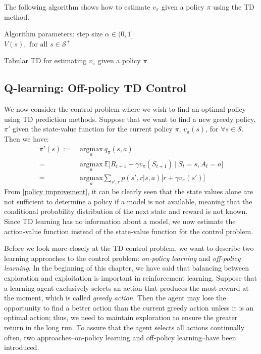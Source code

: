 The following algorithm shows how to estimate $v_\pi$ given a policy $\pi$ using the TD method.

\begin{algorithm}[H]
\SetAlgoLined
 Algorithm parameters: step size $\alpha \in (0,1]$ \\
  $V(s), \text{ for all } s\in \mathcal{S}^+$ \\
 \caption{Tabular TD for estimating $v_\pi$ given a policy $\pi$}
\end{algorithm}

\subsection{Q-learning: Off-policy TD Control}
\label{subsec: Q-learning}
We now consider the control problem where we wish to find an optimal policy using TD prediction methods. Suppose that we want to find a new greedy policy, $\pi'$ given the state-value function for the current policy $\pi$, $v_\pi(s)$, for $\forall s\in \mathcal{S}$. Then we have:
\begin{align}
    \pi'(s) :=& \ \underset{a}{\text{argmax}} \ q_\pi(s,a)\nonumber\\
    =& \ \underset{a}{\text{argmax}}  \ \mathbb{E}\big[R_{t+1} + \gamma v_\pi(S_{t+1}) \ | \ S_t = s, A_t = a\big]\nonumber\\
    =& \ \underset{a}{\text{argmax}} \sum_{s', r} p(s', r | s, a)\big[r + \gamma v_\pi(s')\big] \label{policy improvement}
\end{align}
From \eqref{policy improvement}, it can be clearly seen that the state values alone are not sufficient to determine a policy if a model is not available, meaning that the conditional probability distribution of the next state and reward is not known. Since TD learning has no information about a model, we now estimate the action-value function instead of the state-value function for the control problem.

Before we look more closely at the TD control problem, we want to describe two learning approaches to the control problem: \textit{on-policy learning} and \textit{off-policy learning}. In the beginning of this chapter, we have said that balancing between exploration and exploitation is important in reinforcement learning. Suppose that a learning agent exclusively selects an action that produces the most reward at the moment, which is called \textit{greedy action}. Then the agent may lose the opportunity to find a better action than the current greedy action unless it is an optimal action; thus, we need to maintain exploration to ensure the greater return in the long run. To assure that the agent selects all actions continually often, two approaches--on-policy learning and off-policy learning--have been introduced.

